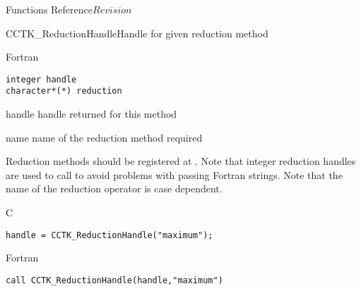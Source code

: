 \begin{cactuspart}{ Functions Reference}{}{$Revision$}
\begin{FunctionDescription}{CCTK\_ReductionHandle}{Handle for given reduction method}
\begin{SynopsisSection}
\begin{Synopsis}{Fortran}
\begin{verbatim}
integer handle
character*(*) reduction\end{verbatim}
\end{Synopsis}
\end{SynopsisSection}
\begin{ParameterSection}
\begin{Parameter}{handle}
handle returned for this method
\end{Parameter}
\begin{Parameter}{name}
name of the reduction method required
\end{Parameter}
\end{ParameterSection}
\begin{Discussion}
Reduction methods should be registered at . Note that
integer reduction handles are used to call  to avoid
problems with passing Fortran strings. Note that the name of the reduction
operator is case dependent.
\end{Discussion}
\begin{ExampleSection}
\begin{Example}{C}
\begin{verbatim}
handle = CCTK_ReductionHandle("maximum");
\end{verbatim}
\end{Example}
\begin{Example}{Fortran}
\begin{verbatim}
call CCTK_ReductionHandle(handle,"maximum")
\end{verbatim}
\end{Example}
\end{ExampleSection}
\end{FunctionDescription}


\end{cactuspart}
